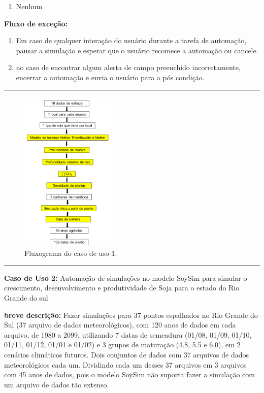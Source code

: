 \documentclass[tg]{mdtufsm}
\begin{document}
	\begin{enumerate}
		\item Nenhum
	\end{enumerate}

	{\bf Fluxo de exceção:}

	\begin{enumerate}
		\item Em caso de qualquer interação do usuário durante a tarefa de automação, pausar a simulação e esperar que o usuário recomece a automação ou cancele.
		\item no caso de encontrar algum alerta de campo preenchido incorretamente, encerrar a automação e envia o usuário para a pós condição.
	\end{enumerate}

	\bigskip \hrule \bigskip

	\begin{figure}[!htbp]
		{\centering
		\includegraphics[width=0.4\textwidth]{imagens/SimanihotFlux}
		\caption{Fluxograma do caso de uso 1.}
		\label{fig:SimanihotFlux}}
	\end{figure}

	\bigskip \hrule \bigskip

	{\bf Caso de Uso 2:} Automação de simulações no modelo SoySim para simular o crescimento, desenvolvimento e produtividade de Soja para o estado do Rio Grande do sul
	\bigskip

	{\bf breve descrição:} Fazer simulações para 37 pontos espalhados no Rio Grande do Sul (37 arquivo de dados meteorológicos), com 120 anos de dados em cada arquivo, de 1980 a 2099, utilizando 7 datas de semeadura (01/08, 01/09, 01/10, 01/11, 01/12, 01/01 e 01/02) e 3 grupos de maturação (4.8, 5.5 e 6.0), em 2 cenários climáticos futuros. Dois conjuntos de dados com 37 arquivos de dados meteorológicos cada um. Dividindo cada um desses 37 arquivos em 3 arquivos com 45 anos de dados, pois o modelo SoySim não suporta fazer a simulação com um arquivo de dados tão extenso.
	\bigskip
\end{document}
